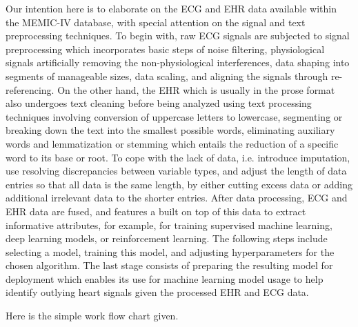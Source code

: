 Our intention here is to elaborate on the ECG and EHR data available within the MEMIC-IV database, with special attention on the signal and text preprocessing techniques. To begin with, raw ECG signals are subjected to signal preprocessing which incorporates basic steps of noise filtering, physiological signals artificially removing the non-physiological interferences, data shaping into segments of manageable sizes, data scaling, and aligning the signals through re-referencing. On the other hand, the EHR which is usually in the prose format also undergoes text cleaning before being analyzed using text processing techniques involving conversion of uppercase letters to lowercase, segmenting or breaking down the text into the smallest possible words, eliminating auxiliary words and lemmatization or stemming which entails the reduction of a specific word to its base or root. To cope with the lack of data, i.e. introduce imputation, use resolving discrepancies between variable types, and adjust the length of data entries so that all data is the same length, by either cutting excess data or adding additional irrelevant data to the shorter entries. After data processing, ECG and EHR data are fused, and features a built on top of this data to extract informative attributes, for example, for training supervised machine learning, deep learning models, or reinforcement learning. The following steps include selecting a model, training this model, and adjusting hyperparameters for the chosen algorithm. The last stage consists of preparing the resulting model for deployment which enables its use for machine learning model usage to help identify outlying heart signals given the processed EHR and ECG data.
\vspace{0.5cm}


Here is the simple work flow chart given. 

